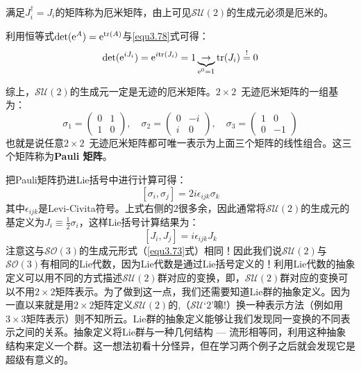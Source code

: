 满足$J_i^\dag = J_i$的矩阵称为厄米矩阵，由上可见$\mathcal{SU}(2)$的生成元必须是厄米的。

利用恒等式$\det (\mathrm{e}^A) = \mathrm{e}^{\text{tr} (A)}$与\ref{equ3.78}式可得：
\begin{equation}
\label{equ3.80}
\det (\mathrm{e}^{i J_i}) = \mathrm{e}^{i \text{tr}(J_i)} = 1 \underbrace{\rightarrow}_{\mathrm{e}^0 = 1} \text{tr} (J_i) \stackrel{!}{=} 0
\end{equation}

综上，$\mathcal{SU}(2)$的生成元一定是无迹的厄米矩阵。$2 \times 2$\ 无迹厄米矩阵的一组基为：
\begin{equation}
\label{equ3.81}
\sigma_1 =	\begin{pmatrix}
				0 & 1 \\ 1 & 0
			\end{pmatrix}
, \quad
\sigma_2 = 	\begin{pmatrix}
				0 & -i \\ i & 0
			\end{pmatrix}
, \quad
\sigma_3 =	\begin{pmatrix}
				1 & 0 \\ 0 & -1
			\end{pmatrix}
\end{equation}
也就是说任意$2 \times 2$\ 无迹厄米矩阵都可唯一表示为上面三个矩阵的线性组合。这三个矩阵称为{\bf Pauli 矩阵}。

把Pauli矩阵扔进Lie括号中进行计算可得：
\begin{equation}
\label{equ3.82}
[\sigma_i, \sigma_j] = 2i \epsilon_{ijk} \sigma_{k}
\end{equation}
其中$\epsilon_{ijk}$是Levi-Civita符号。上式右侧的$2$很多余，因此通常将$\mathcal{SU}(2)$的生成元的基定义为$J_i \equiv \frac{1}{2} \sigma_i$，这样Lie括号计算结果为：
\begin{equation}
\label{equ3.83}
[J_i, J_j] = i \epsilon_{ijk} J_k
\end{equation}
注意这与$\mathcal{SO}(3)$的生成元形式（\ref{equ3.73}式）相同！因此我们说$\mathcal{SU}(2)$与$\mathcal{SO}(3)$有相同的Lie代数，因为Lie代数是通过Lie括号定义的！利用Lie代数的抽象定义可以用不同的方式描述$\mathcal{SU}(2)$群对应的变换，即，$\mathcal{SU}(2)$群对应的变换可以不用$2 \times 2$矩阵表示。为了做到这一点，我们还需要知道Lie群的抽象定义。因为一直以来就是用$2 \times 2$矩阵定义$\mathcal{SU}(2)$的,（$\mathcal{SU}$‘$2$’嘛!）换一种表示方法（例如用$3 \times 3$矩阵表示）则不知所云。Lie群的抽象定义能够让我们发现同一变换的不同表示之间的关系。抽象定义将Lie群与一种几何结构 --- 流形相等同，利用这种抽象结构来定义一个群。这一想法初看十分怪异，但在学习两个例子之后就会发现它是超级有意义的。



